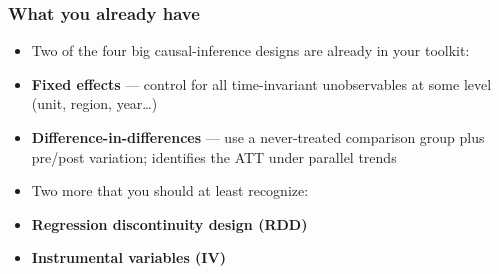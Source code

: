 \begin{frame}
\frametitle{What you already have}
\centering

\begin{itemize}
\item[] Two of the four big causal-inference designs are already in your toolkit:
\vspace{10pt}
\item \textbf{Fixed effects} --- control for all time-invariant unobservables at some level (unit, region, year\ldots)
\vspace{6pt}
\item \textbf{Difference-in-differences} --- use a never-treated comparison group plus pre/post variation; identifies the ATT under parallel trends
\vspace{10pt}
\item[] Two more that you should at least recognize:
\vspace{6pt}
\item \textbf{Regression discontinuity design (RDD)}
\item \textbf{Instrumental variables (IV)}
\end{itemize}

\end{frame}

